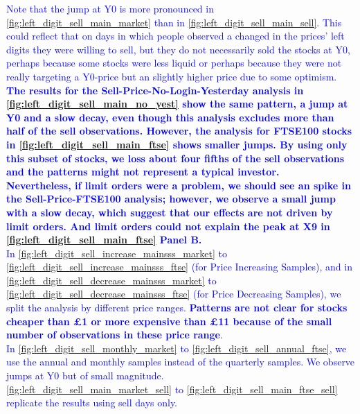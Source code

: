 \documentclass[
	USenglish,12pt,paper=a4,numbers=noenddot,abstract=on,
	final,%
	fullsample,
    ]{scrartcl}
\begin{document}
\textcolor{blue}{Note that the jump at Y0 is more pronounced in \ref{fig:left_digit_sell_main_market} than in \ref{fig:left_digit_sell_main_sell}. This could reflect that on days in which people observed a changed in the prices' left digits they were willing to sell, but they do not necessarily sold the stocks at Y0, perhaps because some stocks were less liquid or perhaps because they were not really targeting a Y0-price but an slightly higher price due to some optimism. \\
\textbf{The results for the Sell-Price-No-Login-Yesterday analysis in \ref{fig:left_digit_sell_main_no_yest}  show the same pattern, a jump at Y0 and a slow decay, even though this analysis excludes more than half of the sell observations. However, the analysis for FTSE100 stocks in  \ref{fig:left_digit_sell_main_ftse} shows smaller jumps. By using only this subset of stocks, we loss about four fifths of the sell observations and the patterns might not represent a typical investor. \\
Nevertheless, if limit orders were a problem, we should see an spike in the Sell-Price-FTSE100 analysis; however, we observe a small jump with a slow decay, which suggest that our effects are not driven by limit orders. And limit orders could not explain the peak at X9 in \ref{fig:left_digit_sell_main_ftse} Panel B. } \\
In \ref{fig:left_digit_sell_increase_mainsss_market} to \ref{fig:left_digit_sell_increase_mainsss_ftse} (for Price Increasing Samples), and in \ref{fig:left_digit_sell_decrease_mainsss_market} to \ref{fig:left_digit_sell_decrease_mainsss_ftse} (for Price Decreasing Samples), we split the analysis by different price ranges. \textbf{Patterns are not clear for stocks cheaper than £1 or more expensive than £11 because of the small number of observations in these price range}. \\
In \ref{fig:left_digit_sell_monthly_market} to \ref{fig:left_digit_sell_annual_ftse}, we use the annual and monthly samples instead of the quarterly samples. We observe jumps at Y0 but of small magnitude. \\
\ref{fig:left_digit_sell_main_market_sell} to \ref{fig:left_digit_sell_main_ftse_sell} replicate the results using sell days only. \\}



\clearpage
\end{document}
